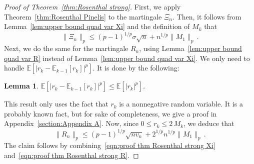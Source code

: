 \documentclass[10pt]{amsart}
\newtheorem{lemm}[theo]{Lemma}\newtheorem{prop}[theo]{Proposition}\newtheorem{coro}[theo]{Corollary}\newtheorem{conj}[theo]{Conjecture}
\theoremstyle{definition}\newtheorem{defi}[theo]{Definition}\newtheorem{rema}[theo]{Remark}\newtheorem{exam}[theo]{Example}\newtheorem{exem}[theo]{Example}\newtheorem{nota}[theo]{Notation}
\newcommand{\bE}{\mathbb{E}}
\begin{document}
\begin{proof}[Proof of Theorem~\ref{thm:Rosenthal strong}]
First, we apply Theorem~\ref{thm:Rosenthal Pinelis} to the martingale $\Xi_n$. Then, it follows from Lemma~\ref{lem:upper bound quad var Xi} and the definition of $M_k$ that
\begin{equation}\label{eqn:proof thm Rosenthal strong Xi}
\|\Xi_n\|_p\leq (p-1)^{1/p}\sigma\sqrt n +n^{1/p} \|M_1\|_p\,.
\end{equation}
Next, we do the same for the martingale $R_n$, using Lemma~\ref{lem:upper bound quad var R} instead of Lemma~\ref{lem:upper bound quad var Xi}. We only need to handle $\bE[|r_k-\bE_{k-1}[r_k]|^p]$. It is done by the following:
\begin{lemm}\label{lem:moment nonnegative rv recentered}
$\bE[|r_k-\bE_{k-1}[r_k]|^p]\leq \bE[|r_k|^p]$.
\end{lemm}

This result only uses the fact that $r_k$ is a nonnegative random variable. It is a probably known fact, but for sake of completeness, we give a proof in Appendix~\ref{section:Appendix A}. Now, since $0\leq r_k\leq 2\,M_k$, we deduce that
\begin{equation}\label{eqn:proof thm Rosenthal strong R}
\|R_n\|_p\leq (p-1)^{1/p}\sqrt{nv_n}+2^{1/p}n^{1/p} \|M_1\|_p\,.
\end{equation}
The claim follows by combining~\eqref{eqn:proof thm Rosenthal strong Xi} and~\eqref{eqn:proof thm Rosenthal strong R}.
\end{proof}
\end{document}
